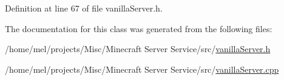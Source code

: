 Definition at line 67 of file vanilla\+Server.\+h.



The documentation for this class was generated from the following files\+:\begin{DoxyCompactItemize}
\item 
/home/mel/projects/\+Misc/\+Minecraft Server Service/src/\hyperlink{vanilla_server_8h}{vanilla\+Server.\+h}\item 
/home/mel/projects/\+Misc/\+Minecraft Server Service/src/\hyperlink{vanilla_server_8cpp}{vanilla\+Server.\+cpp}\end{DoxyCompactItemize}
